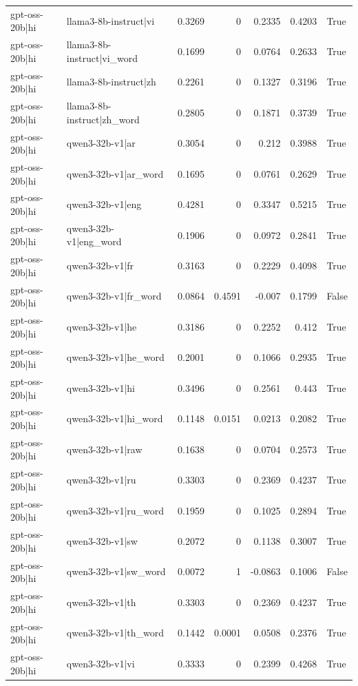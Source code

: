 \begin{table}
\begin{tabular}{l l r r r r l}
gpt-oss-20b|hi & llama3-8b-instruct|vi & 0.3269 & 0 & 0.2335 & 0.4203 & True \\
gpt-oss-20b|hi & llama3-8b-instruct|vi_word & 0.1699 & 0 & 0.0764 & 0.2633 & True \\
gpt-oss-20b|hi & llama3-8b-instruct|zh & 0.2261 & 0 & 0.1327 & 0.3196 & True \\
gpt-oss-20b|hi & llama3-8b-instruct|zh_word & 0.2805 & 0 & 0.1871 & 0.3739 & True \\
gpt-oss-20b|hi & qwen3-32b-v1|ar & 0.3054 & 0 & 0.212 & 0.3988 & True \\
gpt-oss-20b|hi & qwen3-32b-v1|ar_word & 0.1695 & 0 & 0.0761 & 0.2629 & True \\
gpt-oss-20b|hi & qwen3-32b-v1|eng & 0.4281 & 0 & 0.3347 & 0.5215 & True \\
gpt-oss-20b|hi & qwen3-32b-v1|eng_word & 0.1906 & 0 & 0.0972 & 0.2841 & True \\
gpt-oss-20b|hi & qwen3-32b-v1|fr & 0.3163 & 0 & 0.2229 & 0.4098 & True \\
gpt-oss-20b|hi & qwen3-32b-v1|fr_word & 0.0864 & 0.4591 & -0.007 & 0.1799 & False \\
gpt-oss-20b|hi & qwen3-32b-v1|he & 0.3186 & 0 & 0.2252 & 0.412 & True \\
gpt-oss-20b|hi & qwen3-32b-v1|he_word & 0.2001 & 0 & 0.1066 & 0.2935 & True \\
gpt-oss-20b|hi & qwen3-32b-v1|hi & 0.3496 & 0 & 0.2561 & 0.443 & True \\
gpt-oss-20b|hi & qwen3-32b-v1|hi_word & 0.1148 & 0.0151 & 0.0213 & 0.2082 & True \\
gpt-oss-20b|hi & qwen3-32b-v1|raw & 0.1638 & 0 & 0.0704 & 0.2573 & True \\
gpt-oss-20b|hi & qwen3-32b-v1|ru & 0.3303 & 0 & 0.2369 & 0.4237 & True \\
gpt-oss-20b|hi & qwen3-32b-v1|ru_word & 0.1959 & 0 & 0.1025 & 0.2894 & True \\
gpt-oss-20b|hi & qwen3-32b-v1|sw & 0.2072 & 0 & 0.1138 & 0.3007 & True \\
gpt-oss-20b|hi & qwen3-32b-v1|sw_word & 0.0072 & 1 & -0.0863 & 0.1006 & False \\
gpt-oss-20b|hi & qwen3-32b-v1|th & 0.3303 & 0 & 0.2369 & 0.4237 & True \\
gpt-oss-20b|hi & qwen3-32b-v1|th_word & 0.1442 & 0.0001 & 0.0508 & 0.2376 & True \\
gpt-oss-20b|hi & qwen3-32b-v1|vi & 0.3333 & 0 & 0.2399 & 0.4268 & True \\

\end{tabular}
\end{table}
